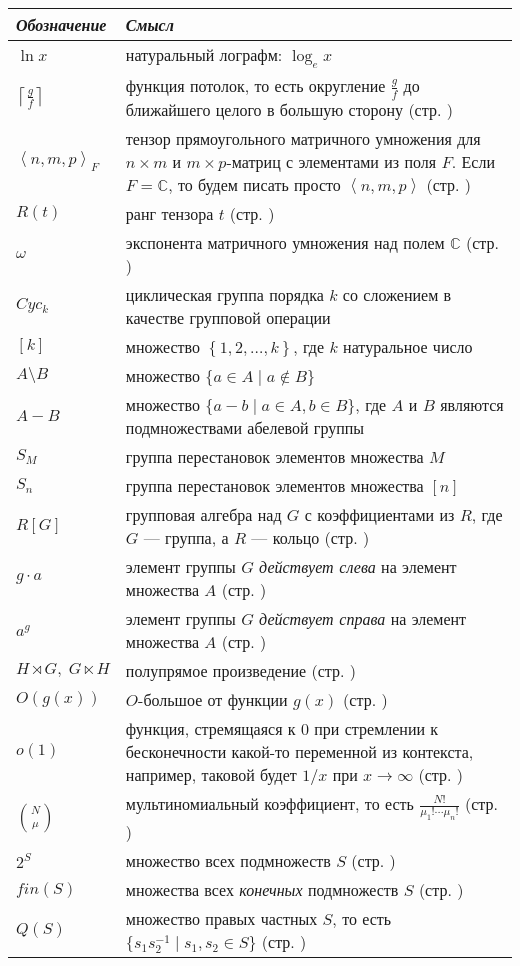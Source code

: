 \begin{tabular}{lp{11cm}}
  \textit{Обозначение} & \textit{Смысл} \\
  \hline
  $\ln x$ & натуральный лографм: $\log_e x$  \\
  $\left\lceil \frac{g}{f} \right\rceil$ & функция потолок, то есть округление $\frac{g}{f}$ до ближайшего целого в большую сторону (стр. \pageref{lem:bi:6.5})\\
  $\left\langle n,m,p \right\rangle_F$ & тензор прямоугольного матричного умножения для $n \times m$ и $m \times p$-матриц с элементами из поля $F$. Если $F = \mathbb{C}$, то будем писать просто $\left\langle n,m,p \right\rangle$ (стр. \pageref{matrix_tensor})\\
  $R(t)$ & ранг тензора $t$ (стр. \pageref{def:tensor_rank})\\
  $\omega$ & экспонента матричного умножения над полем $\mathbb{C}$ (стр. \pageref{def:omega})\\
  $Cyc_k$ & циклическая группа порядка $k$ со сложением в качестве групповой операции\\
  $[k]$ & множество $\left\{ 1,2, \dotsc, k \right\}$, где $k$ натуральное число \\
  $A \setminus B$ & множество ${\{a \in A \mid a \notin B\}}$\\
  $A - B$ & множество $\{a - b \mid a \in A, b \in B\}$, где $A$ и $B$ являются подмножествами абелевой группы\\
  $S_M$ & группа перестановок элементов множества $M$\\
  $S_n$ & группа перестановок элементов множества $[n]$\\
  $R[G]$ & групповая алгебра над $G$ с коэффициентами из $R$, где $G$ --- группа, а $R$ --- кольцо (стр. \pageref{group_algebra})\\
  $g \cdot a$ & элемент группы $G$ \textit{действует слева} на элемент множества $A$ (стр. \pageref{action})\\
  $a^g$ & элемент группы $G$ \textit{действует справа} на элемент множества $A$ (стр. \pageref{action})\\
  $H \rtimes G, \; G \ltimes H$ & полупрямое произведение (стр. \pageref{semidirect_product})\\
  $O(g(x))$ & $O$-большое от функции $g(x)$ (стр. \pageref{o_notation})\\
  $o(1)$ & функция, стремящаяся к 0 при стремлении к бесконечности какой-то переменной из контекста, например, таковой будет $1/x$ при $x \to \infty$ (стр. \pageref{little-oh})\\
  $\binom{N}{\mu}$ & мультиномиальный коэффициент, то есть $\frac{N!}{\mu_1! \dotsm \mu_n!}$ (стр. \pageref{lem:05:1.1})\\
  $2^S$ & множество всех подмножеств $S$ (стр. \pageref{def:05:6.5})\\
  $fin(S)$ & множества всех \textit{конечных} подмножеств $S$ (стр. \pageref{sec:general_model})\\
  $Q(S)$ & множество правых частных $S$, то есть $\{ s_1 s_2^{-1} \mid s_1, s_2 \in S\}$ (стр. \pageref{sec:realizing})\\
\end{tabular}
